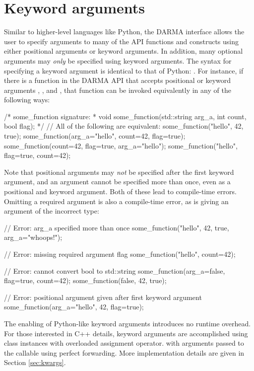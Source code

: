 \section{Keyword arguments}
\label{sec:keyword}
Similar to higher-level languages like Python, the DARMA \CC{} interface allows the user
to specify arguments to many of the \gls{API} functions and constructs using
either \glspl{positional argument}
or \glspl{keyword argument}. In addition, many optional arguments may {\em only} be specified using
\glspl{keyword argument}. The syntax for specifying a \gls{keyword argument} is identical to that
of Python: .  For instance, if there is 
a function  in the DARMA \gls{API} that accepts 
positional or \glspl{keyword argument} , 
, and , that function can be invoked 
equivalently in any of the following ways:
\begin{CppCode}
/* some_function signature:
 *  void some_function(std::string arg_a, int count, bool flag);
 */
// All of the following are equivalent:
some_function("hello", 42, true);
some_function(arg_a="hello", count=42, flag=true);
some_function(count=42, flag=true, arg_a="hello");
some_function("hello", flag=true, count=42);
\end{CppCode}
Note that \glspl{positional argument} may {\em not} be specified after the
first \gls{keyword argument},
and an argument cannot be specified more than once, even as a positional and
\gls{keyword argument}.  Both of these lead to compile-time errors. Omitting a required argument is 
also a compile-time error, as is giving an argument of the incorrect type: 
\begin{CppCode}
// Error: arg_a specified more than once
some_function("hello", 42, true, arg_a="whoops!");

// Error: missing required argument flag
some_function("hello", count=42);

// Error: cannot convert bool to std::string
some_function(arg_a=false, flag=true, count=42);
some_function(false, 42, true);

// Error: positional argument given after first keyword argument
some_function(arg_a="hello", 42, flag=true);
\end{CppCode}
The enabling of Python-like keyword arguments introduces no runtime overhead.
For those interested in C++ details, keyword arguments are accomplished using  class instances with overloaded assignment operator.  
with arguments passed to the callable using perfect forwarding.
More implementation details are given in Section \ref{sec:kwargs}.  

